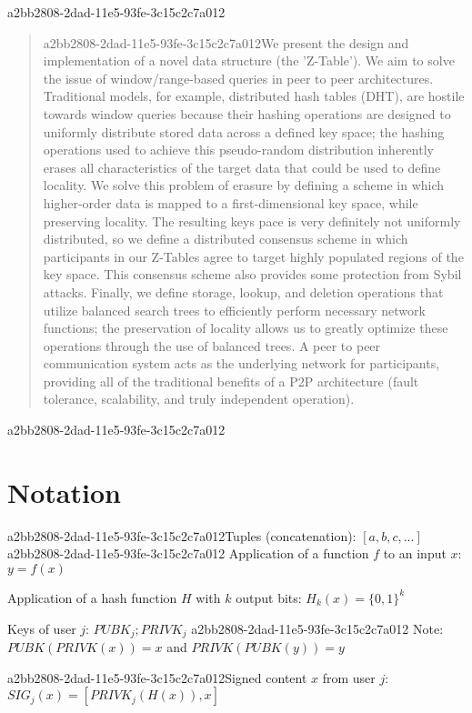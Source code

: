 \documentclass[12pt]{article}
\begin{document}
\maketitle
a2bb2808-2dad-11e5-93fe-3c15c2c7a012
\begin{abstract}
a2bb2808-2dad-11e5-93fe-3c15c2c7a012We present the design and implementation of a novel data structure (the 'Z-Table'). We aim to solve the issue of window/range-based queries in peer to peer architectures. Traditional models, for example,  distributed hash tables (DHT), are hostile towards window queries because their hashing operations are designed to uniformly distribute stored data across a defined key space; the hashing operations used to achieve this pseudo-random distribution inherently erases all characteristics of the target data that could be used to define locality. We solve this problem of erasure by defining a scheme in which higher-order data is mapped to a first-dimensional key space, while preserving locality. The resulting keys pace is very definitely not uniformly distributed, so we define a distributed consensus scheme in which participants in our Z-Tables agree to target highly populated regions of the key space. This consensus scheme also provides some protection from Sybil attacks. Finally, we define storage, lookup, and deletion operations that utilize balanced search trees to efficiently perform necessary network functions; the preservation of locality allows us to greatly optimize these operations through the use of balanced trees. A peer to peer communication system acts as the underlying network for participants, providing all of the traditional benefits of a P2P architecture (fault tolerance, scalability, and truly independent operation).
\end{abstract}
a2bb2808-2dad-11e5-93fe-3c15c2c7a012
\section{Notation}

a2bb2808-2dad-11e5-93fe-3c15c2c7a012Tuples (concatenation): $[a,b,c,...]$
a2bb2808-2dad-11e5-93fe-3c15c2c7a012
Application of a function $f$ to an input $x$: $y=f(x)$

Application of a hash function $H$ with $k$ output bits: $H_{k}(x) = \{0,1\}^k$

Keys of user $j$: $ PUBK_j; PRIVK_j $
a2bb2808-2dad-11e5-93fe-3c15c2c7a012
Note: $PUBK(PRIVK(x)) = x$ and $PRIVK(PUBK(y)) = y$~

a2bb2808-2dad-11e5-93fe-3c15c2c7a012Signed content $x$ from user $j$: $SIG_j(x) = \left[ PRIVK_j( H(x) ), x \right]$
\end{document}
